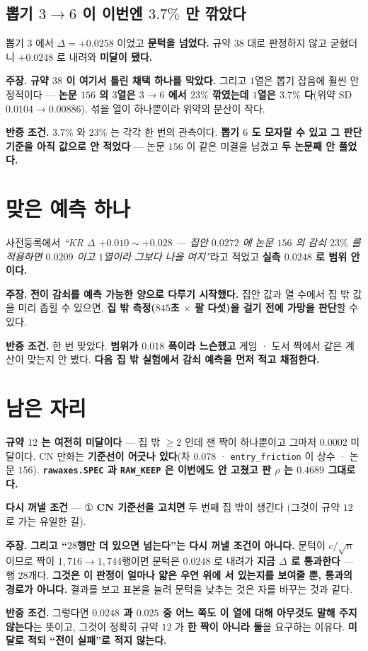 \documentclass[10pt,a4paper]{article}
\newcommand{\claim}[2]{\begin{claimbox}\textbf{주장.} #1\par\smallskip
  \textcolor{gray!70}{\textbf{반증 조건.} #2}\end{claimbox}}
\begin{document}
\subsection*{뽑기 $3 \to 6$ 이 이번엔 $3.7\%$ 만 깎았다}

뽑기 $3$ 에서 $\Delta = +0.0258$ 이었고 \textbf{문턱을 넘었다.} 규약 $38$ 대로 판정하지
않고 굳혔더니 $+0.0248$ 로 내려와 \textbf{미달이 됐다.}

\claim{\textbf{규약 $38$ 이 여기서 틀린 채택 하나를 막았다.} 그리고 $1$열은 뽑기 잡음에
훨씬 안정적이다 --- \textbf{논문 $156$ 의 $3$열은 $3 \to 6$ 에서 $23\%$ 깎였는데
$1$열은 $3.7\%$ 다}(위약 SD $0.0104 \to 0.00886$). 섞을 열이 하나뿐이라 위약의 분산이
작다.}
{$3.7\%$ 와 $23\%$ 는 각각 한 번의 관측이다. \textbf{뽑기 $6$ 도 모자랄 수 있고 그
판단 기준을 아직 값으로 안 적었다} --- 논문 $156$ 이 같은 미결을 남겼고
\textbf{두 논문째 안 풀었다.}}

\section{맞은 예측 하나}

사전등록에서 \emph{``KR $\Delta$ $+0.010 \sim +0.028$ --- 집안 $0.0272$ 에 논문 $156$ 의
감쇠 $23\%$ 를 적용하면 $0.0209$ 이고 $1$열이라 그보다 나을 여지''}라고 적었고
\textbf{실측 $0.0248$ 로 범위 안이다.}

\claim{\textbf{전이 감쇠를 예측 가능한 양으로 다루기 시작했다.} 집안 값과 열 수에서
집 밖 값을 미리 좁힐 수 있으면, \textbf{집 밖 측정($845$초 $\times$ 팔 다섯)을 걸기 전에
가망을 판단}할 수 있다.}
{한 번 맞았다. \textbf{범위가 $0.018$ 폭이라 느슨했고} 게임 · 도서 짝에서 같은 계산이
맞는지 안 봤다. \textbf{다음 집 밖 실험에서 감쇠 예측을 먼저 적고 채점한다.}}

\section{남은 자리}

\textbf{규약 $12$ 는 여전히 미달이다} --- 집 밖 $\geq 2$ 인데 잰 짝이 하나뿐이고
그마저 $0.0002$ 미달이다. CN 만화는 \textbf{기준선이 어긋나 있다}(차 $0.078$ ·
\texttt{entry\_friction} 이 상수 · 논문 $156$). \textbf{\texttt{rawaxes.SPEC} 과
\texttt{RAW\_KEEP} 은 이번에도 안 고쳤고 판 $\rho$ 는 $0.4689$ 그대로다.}

\begin{center}
\textbf{다시 꺼낼 조건} --- ① \textbf{CN 기준선을 고치면} 두 번째 집 밖이 생긴다
(그것이 규약 $12$ 로 가는 유일한 길).
\end{center}

\claim{\textbf{그리고 ``$28$행만 더 있으면 넘는다''는 다시 꺼낼 조건이 아니다.}
문턱이 $c/\sqrt{n}$ 이므로 짝이 $1{,}716 \to 1{,}744$행이면 문턱은 $0.0248$ 로 내려가
\textbf{지금 $\Delta$ 로 통과한다} --- 행 $28$개다. \textbf{그것은 이 판정이 얼마나
얇은 우연 위에 서 있는지를 보여줄 뿐, 통과의 경로가 아니다.} 결과를 보고 표본을 늘려
문턱을 낮추는 것은 자를 바꾸는 것과 같다.}
{그렇다면 \textbf{$0.0248$ 과 $0.025$ 중 어느 쪽도 이 열에 대해 아무것도 말해 주지
않는다}는 뜻이고, 그것이 정확히 규약 $12$ 가 \textbf{한 짝이 아니라 둘}을 요구하는
이유다. \textbf{미달로 적되 ``전이 실패''로 적지 않는다.}}
\end{document}
